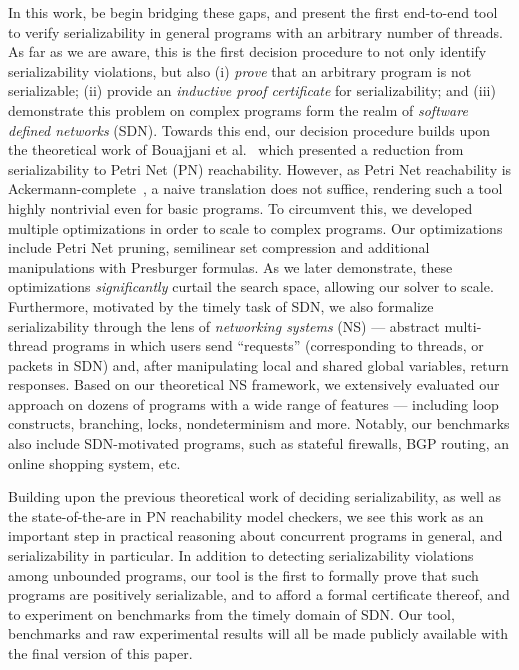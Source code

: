 In this work, be begin bridging these gaps, and present the first end-to-end tool to verify serializability in general programs with an arbitrary number of threads. 
As far as we are aware, this is the first decision procedure to not only identify serializability violations, but also (i) \textit{prove} that an arbitrary program is not serializable; (ii) provide an \textit{inductive proof certificate} for serializability; and (iii) demonstrate this problem on complex programs form the realm of \textit{software defined networks} (SDN).
%
Towards this end, our decision procedure builds upon the theoretical work of Bouajjani et al.~\cite{BoEmEnHa13} which presented a reduction from serializability to Petri Net (PN) reachability.  However, as Petri Net reachability is Ackermann-complete~\cite{CzWo22}, a naive translation does not suffice, rendering such a tool  highly nontrivial even for basic programs. To circumvent this, we developed multiple optimizations in order to scale to complex programs. 
Our optimizations include Petri Net pruning, semilinear set compression and additional manipulations with Presburger formulas.
As we later demonstrate, these optimizations \textit{significantly} curtail the search space, allowing our solver to scale.
%
Furthermore, motivated by the timely task of SDN, 
we also formalize serializability through the lens of \textit{networking systems} (NS) --- abstract multi-thread programs in which users send ``requests'' (corresponding to threads, or packets in SDN) and, after manipulating local and shared global variables, return responses.
Based on our theoretical NS framework, we extensively evaluated our approach on dozens of programs with a wide range of features --- including loop constructs, branching, locks, nondeterminism and more. Notably, our benchmarks also include SDN-motivated programs, such as stateful firewalls, BGP routing, an online shopping system, etc.
  

Building upon the previous theoretical work of deciding serializability, as well as the state-of-the-are in PN reachability model checkers, we see this work as an important step in practical reasoning about concurrent programs in general, and serializability in particular.
In addition to detecting serializability violations among unbounded programs, our tool is the first to formally prove that such programs are positively serializable, and to afford a formal certificate thereof, and to experiment on benchmarks from the timely domain of SDN.
Our tool, benchmarks and raw experimental results will all be made publicly available with the final version of this paper.

